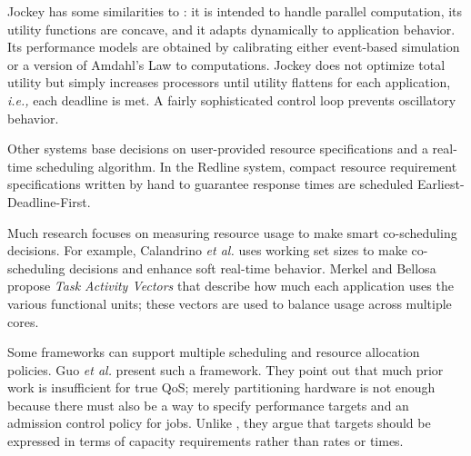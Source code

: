 Jockey\cite{Jockey} has some similarities to \pacora: it is intended to handle parallel computation, its utility functions are concave,
and it adapts dynamically to application behavior.
Its performance models are obtained by calibrating either event-based simulation or a version of Amdahl's Law to computations.
Jockey does not optimize total utility but simply increases processors until utility flattens for each application,
\emph{i.e.,} each deadline is met.
A fairly sophisticated control loop prevents oscillatory behavior.

Other systems base decisions on user-provided resource specifications and a real-time scheduling algorithm.  In the Redline system\cite{Redline}, compact resource requirement specifications written by hand to guarantee response times are scheduled Earliest-Deadline-First.

Much research focuses on measuring resource usage to make smart co-scheduling decisions.
For example, Calandrino \emph{et al.}\cite{unc} uses working set sizes to make co-scheduling decisions and enhance soft real-time behavior. Merkel and Bellosa\cite{merkel-eurosys08} propose \emph{Task Activity Vectors} that describe how much each application uses the various functional units; these vectors are used to balance usage across multiple cores.

 Some frameworks can support multiple scheduling and resource allocation policies. Guo \emph{et al.}\cite{1331730} present such a framework.  They point out that much prior work is insufficient for true QoS; merely partitioning hardware is not enough because there must also be a way to specify performance targets and an admission control policy for jobs. Unlike \pacora, they argue that targets should be expressed in terms of capacity requirements rather than rates or times.


